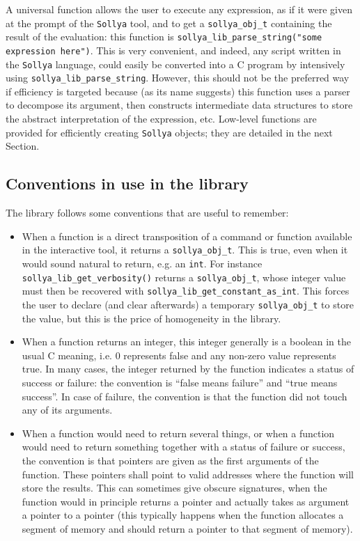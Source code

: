 \documentclass[a4paper]{article}
\newcommand{\sollya}{\texttt{Sollya}\xspace}
\begin{document}
A universal function allows the user to execute any expression, as if it were given at the prompt of the \sollya tool, and to get a \texttt{sollya\_obj\_t} containing the result of the evaluation: this function is \texttt{sollya\_lib\_parse\_string("some expression here")}. This is very convenient, and indeed, any script written in the \sollya language, could easily be converted into a C program by intensively using \texttt{sollya\_lib\_parse\_string}. However, this should not be the preferred way if efficiency is targeted because (as its name suggests) this function uses a parser to decompose its argument, then constructs intermediate data structures to store the abstract interpretation of the expression, etc. Low-level functions are provided for efficiently creating \sollya objects; they are detailed in the next Section.

\subsection{Conventions in use in the library}
The library follows some conventions that are useful to remember:
\begin{itemize}
\item When a function is a direct transposition of a command or function available in the interactive tool, it returns a \verb|sollya_obj_t|. This is true, even when it would sound natural to return, e.g. an \verb|int|. For instance \verb|sollya_lib_get_verbosity()| returns a \verb|sollya_obj_t|, whose integer value must then be recovered with \verb|sollya_lib_get_constant_as_int|. This forces the user to declare (and clear afterwards) a temporary \verb|sollya_obj_t| to store the value, but this is the price of homogeneity in the library.
\item When a function returns an integer, this integer generally is a boolean in the usual C meaning, i.e. $0$ represents false and any non-zero value represents true. In many cases, the integer returned by the function indicates a status of success or failure: the convention is ``false means failure'' and ``true means success''. In case of failure, the convention is that the function did not touch any of its arguments.
\item When a function would need to return several things, or when a function would need to return something together with a status of failure or success, the convention is that pointers are given as the first arguments of the function. These pointers shall point to valid addresses where the function will store the results. This can sometimes give obscure signatures, when the function would in principle returns a pointer and actually takes as argument a pointer to a pointer (this typically happens when the function allocates a segment of memory and should return a pointer to that segment of memory).
\end{itemize}
\end{document}
